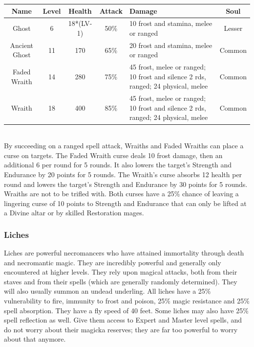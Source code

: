 \documentclass[12pt]{book}
\begin{document}
\begin{tabular}{|c|c|c|c|p{}|c|}
\hline
Name & Level & Health & Attack & Damage & Soul\\ \hline
Ghost & 6 & 18*(LV-1) & 50\% & 10 frost and stamina, melee or ranged & Lesser\\ \hline
Ancient Ghost & 11 & 170 & 65\% & 20 frost and stamina, melee or ranged & Common\\ \hline
Faded Wraith & 14 & 280 & 75\% & 45 frost, melee or ranged; 10 frost and silence 2 rds, ranged; 24 physical, melee & Common\\ \hline
Wraith & 18 & 400 & 85\% & 45 frost, melee or ranged; 10 frost and silence 2 rds, ranged; 24 physical, melee & Common\\ \hline
\end{tabular}\\

By succeeding on a ranged spell attack, Wraiths and Faded Wraiths can place a curse on targets. The Faded Wraith curse deals 10 frost damage, then an additional 6 per round for 5 rounds. It also lowers the target's Strength and Endurance by 20 points for 5 rounds. The Wraith's curse absorbs 12 health per round and lowers the target's Strength and Endurance by 30 points for 5 rounds. Wraiths are not to be trifled with. Both curses have a 25\% chance of leaving a lingering curse of 10 points to Strength and Endurance that can only be lifted at a Divine altar or by skilled Restoration mages.

\subsubsection{Liches}
Liches are powerful necromancers who have attained immortality through death and necromantic magic. They are incredibly powerful and generally only encountered at higher levels. They rely upon magical attacks, both from their staves and from their spells (which are generally randomly determined). They will also usually summon an undead underling. All liches have a 25\% vulnerability to fire, immunity to frost and poison, 25\% magic resistance and 25\% spell absorption. They have a fly speed of 40 feet. Some liches may also have 25\% spell reflection as well. Give them access to Expert and Master level spells, and do not worry about their magicka reserves; they are far too powerful to worry about that anymore.
\end{document}
